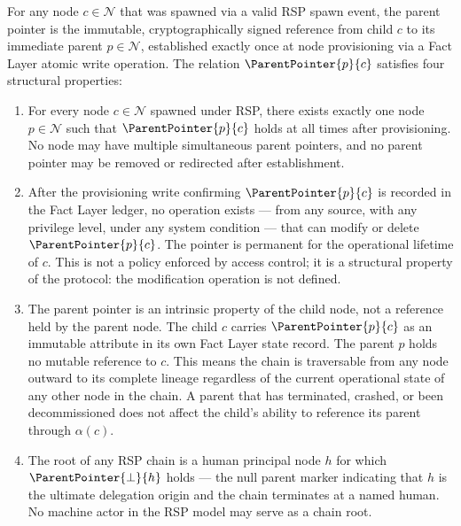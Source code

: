 \begin{dfn}
\label{dfn:rs-parent-pointer}
For any node $c \in \mathcal{N}$ that was spawned via a valid RSP spawn event, the parent pointer is the immutable, cryptographically signed reference from child $c$ to its immediate parent $p \in \mathcal{N}$, established exactly once at node provisioning via a Fact Layer atomic write operation. The relation $\ParentPointer{p}{c}$ satisfies four structural properties:

\begin{enumerate}
    \item[(P1) \textbf{Uniqueness}] For every node $c \in \mathcal{N}$ spawned under RSP, there exists exactly one node $p \in \mathcal{N}$ such that $\ParentPointer{p}{c}$ holds at all times after provisioning. No node may have multiple simultaneous parent pointers, and no parent pointer may be removed or redirected after establishment.

    \item[(P2) \textbf{Immutability}] After the provisioning write confirming $\ParentPointer{p}{c}$ is recorded in the Fact Layer ledger, no operation exists --- from any source, with any privilege level, under any system condition --- that can modify or delete $\ParentPointer{p}{c}$. The pointer is permanent for the operational lifetime of $c$. This is not a policy enforced by access control; it is a structural property of the protocol: the modification operation is not defined.

    \item[(P3) \textbf{Directionality}] The parent pointer is an intrinsic property of the child node, not a reference held by the parent node. The child $c$ carries $\ParentPointer{p}{c}$ as an immutable attribute in its own Fact Layer state record. The parent $p$ holds no mutable reference to $c$. This means the chain is traversable from any node outward to its complete lineage regardless of the current operational state of any other node in the chain. A parent that has terminated, crashed, or been decommissioned does not affect the child's ability to reference its parent through $\alpha(c)$.

    \item[(P4) \textbf{Termination at Human Anchor}] The root of any RSP chain is a human principal node $h$ for which $\ParentPointer{\bot}{h}$ holds --- the null parent marker indicating that $h$ is the ultimate delegation origin and the chain terminates at a named human. No machine actor in the RSP model may serve as a chain root.
\end{enumerate}
\end{dfn}

